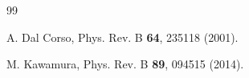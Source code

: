 \documentclass[12pt]{article}
\begin{document}
\begin{thebibliography}{99}
  
  A. Dal Corso, Phys. Rev. B {\bf 64}, 235118 (2001).

  M. Kawamura, Phys. Rev. B {\bf 89}, 094515 (2014).
  
\end{thebibliography}
\end{document}
